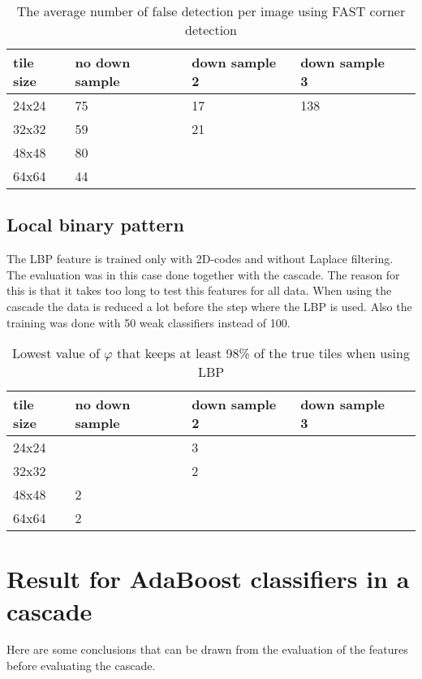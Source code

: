 \begin{table}[H]
\begin{center}
     \begin{tabular}{ | l | l | l | l | l |}
     \hline
     tile size & no down sample & down sample 2 & down sample 3 \\ \hline
   	 24x24 & 75 & 17 & 138		\\ \hline
     32x32 & 59 & 21 & 			\\ \hline
     48x48 & 80    &     &  	\\ \hline
     64x64 & 44     &     &		\\ \hline
     \end{tabular}
\end{center}
\caption{The average number of false detection per image using FAST corner detection}
\end{table}

\subsection{Local binary pattern}
\label{subsec:Local binary pattern}
The LBP feature is trained only with 2D-codes and without Laplace filtering. The evaluation was in this case done together with the cascade. The reason for this is that it takes too long to test this features for all data. When using the cascade the data is reduced a lot before the step where the LBP is used. Also the training was done with 50 weak classifiers instead of 100.

\begin{table}[H]
\begin{center}
     \begin{tabular}{ | l | l | l | l | l |}
     \hline
     tile size & no down sample & down sample 2 & down sample 3 \\ \hline
   	 24x24 &  & 3 & 		\\ \hline
     32x32 &  & 2 & 			\\ \hline
     48x48 & 2 &     &  		\\ \hline
     64x64 & 2 &     &			\\ \hline
     \end{tabular}
\end{center}
\caption{Lowest value of $\varphi$ that keeps at least 98\% of the true tiles when using LBP}
\end{table}


\section{Result for AdaBoost classifiers in a cascade}
\label{sec:Result for AdaBoost classifiers in a cascade}
Here are some conclusions that can be drawn from the evaluation of the features before evaluating the cascade.

